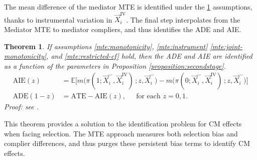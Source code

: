 The mean difference of the mediator MTE is identified under the \ref{thm:mte-identification} assumptions, thanks to instrumental variation in $\vec X_i^{\text{IV}}$.
The final step interpolates from the Mediator MTE to mediator compliers, and thus identifies the ADE and AIE.

\newtheorem{theoremMTE}{Theorem}
\renewcommand\thetheoremMTE{MTE Approach}
\begin{theoremMTE}
    \label{thm:mte-identification}
    If assumptions \ref{mte:monotonicity}, \ref{mte:instrument} \ref{mte:joint-monotonicity}, and \ref{mte:restricted-cf} hold, then the ADE and AIE are identified as a function of the parameters in Proposition \ref{proposition:secondstage}.
    \begin{align*}
        \text{AIE}(z) &= \mathbb E \Big[
            m\big(\pi(1; \vec X_i^-, \vec X_i^\text{IV})\,; z, \vec X_i^- \big)
            - m\big(\pi(0; \vec X_i^-, \vec X_i^\text{IV})\,; z, \vec X_i^- \big)
            \Big] \\
        \text{ADE}(1-z) &=
            \text{ATE} - \text{AIE}(z), \;\;\;\; \text{ for each } z=0,1.
    \end{align*}
    Proof: see .
\end{theoremMTE}

This theorem provides a solution to the identification problem for CM effects when facing selection.
The MTE approach measures both selection bias and complier differences, and thus purges these persistent bias terms to identify CM effects.
